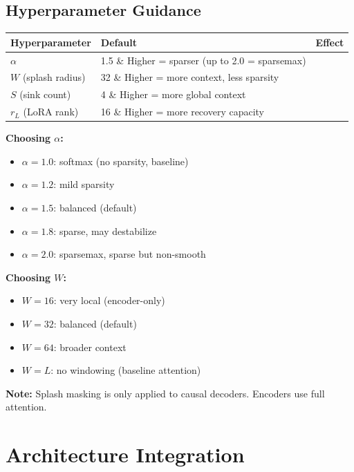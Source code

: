 \subsection{Hyperparameter Guidance}

\begin{table}[H]
\centering
\small
\begin{tabular}{lll}
\toprule
\textbf{Hyperparameter} & \textbf{Default} & \textbf{Effect} \\
\midrule
$\alpha$ & 1.5 \& Higher = sparser (up to 2.0 = sparsemax) \\
$W$ (splash radius) & 32 \& Higher = more context, less sparsity \\
$S$ (sink count) & 4 \& Higher = more global context \\
$r_L$ (LoRA rank) & 16 \& Higher = more recovery capacity \\
\bottomrule
\end{tabular}
\end{table}

\textbf{Choosing $\alpha$:}

\begin{itemize}
\item $\alpha = 1.0$: softmax (no sparsity, baseline)
\item $\alpha = 1.2$: mild sparsity
\item $\alpha = 1.5$: balanced (default)
\item $\alpha = 1.8$: sparse, may destabilize
\item $\alpha = 2.0$: sparsemax, sparse but non-smooth

\end{itemize}
\textbf{Choosing $W$:}

\begin{itemize}
\item $W = 16$: very local (encoder-only)
\item $W = 32$: balanced (default)
\item $W = 64$: broader context
\item $W = L$: no windowing (baseline attention)

\end{itemize}
\textbf{Note:} Splash masking is only applied to causal decoders. Encoders use 
full attention.


\section{Architecture Integration}

